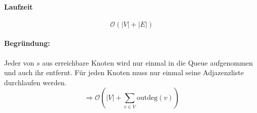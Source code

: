 \paragraph{Laufzeit}
\[ \mathcal{O}(|V|+|E|) \]
\paragraph{Begründung:}
Jeder von $s$ aus erreichbare Knoten wird nur einmal in die Queue aufgenommen und auch ihr entfernt. Für jeden Knoten muss nur einmal seine Adjazenzliste durchlaufen werden.
\[  \Rightarrow \mathcal{O}\left(|V|+\sum_{v \in V}\text{outdeg}(v) \right) \]\vspace{-200pt}